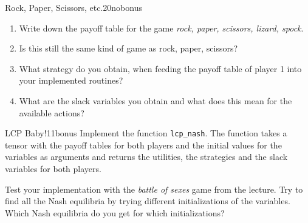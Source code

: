 \documentclass[twoside,english,colorbacktitle,accentcolor=tud9c,10pt]{tudexercise}
\begin{document}
\begin{questions}
\begin{question}{Rock, Paper, Scissors, etc.}{20}{nobonus}
\begin{itemize}
		\begin{enumerate}
			\item Write down the payoff table for the game \emph{rock, paper, scissors, lizard, spock}.
			\item Is this still the same kind of game as rock, paper, scissors?
			\item What strategy do you obtain, when feeding the payoff table of player 1 into your implemented routines?
			\item What are the slack variables you obtain and what does this mean for the available actions?
		\end{enumerate}
	\end{itemize}
\end{question}

\begin{question}{LCP Baby!}{11}{bonus}
	Implement the function \texttt{lcp\_nash}.
	The function takes a tensor with the payoff tables for both players and the initial values for the variables as arguments and returns the utilities, the strategies and the slack variables for both players.

	Test your implementation with the \emph{battle of sexes} game from the lecture.
	Try to find all the Nash equilibria by trying different initializations of the variables.
	Which Nash equilibria do you get for which initializations?
\end{question}

\end{questions}
\end{document}
